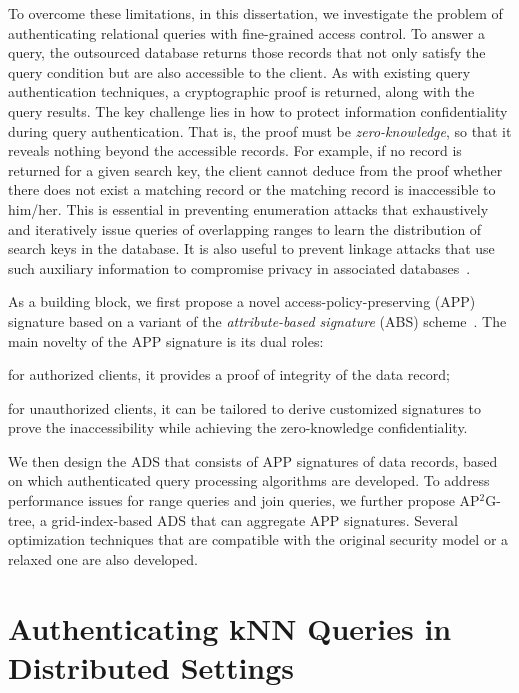 To overcome these limitations, in this dissertation, we investigate the problem of authenticating relational queries with fine-grained access control. To answer a query, the outsourced database returns those records that not only satisfy the query condition but are also accessible to the client. As with existing query authentication techniques, a cryptographic proof is returned, along with the query results. The key challenge lies in how to protect information confidentiality during query authentication. That is, the proof must be \emph{zero-knowledge}, so that it reveals nothing beyond the accessible records. For example, if no record is returned for a given search key, the client cannot deduce from the proof whether there does not exist a matching record or the matching record is inaccessible to him/her. This is essential in preventing enumeration attacks that exhaustively and iteratively issue queries of overlapping ranges to learn the distribution of search keys in the database. It is also useful to prevent linkage attacks that use such auxiliary information to compromise privacy in associated databases~\cite{10.1145/1749603.1749605}.

As a building block, we first propose a novel access-policy-preserving (APP) signature based on a variant of the \emph{attribute-based signature} (ABS) scheme~\cite{10.1007/978-3-642-19074-2_24}. The main novelty of the APP signature is its dual roles:
\begin{inlineenum}
  \item for authorized clients, it provides a proof of integrity of the data record;
  \item for unauthorized clients, it can be tailored to derive customized signatures to prove the inaccessibility while achieving the zero-knowledge confidentiality.
\end{inlineenum}
We then design the ADS that consists of APP signatures of data records, based on which authenticated query processing algorithms are developed. To address performance issues for range queries and join queries, we further propose AP$^2$G-tree, a grid-index-based ADS that can aggregate APP signatures. Several optimization techniques that are compatible with the original security model or a relaxed one are also developed.

\section{Authenticating {kNN} Queries in Distributed Settings}


